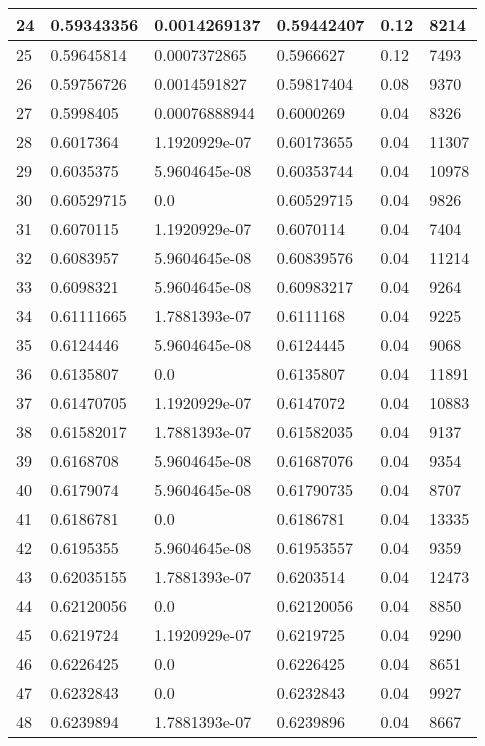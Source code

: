 \begin{longtable}{|l|l|l|l|l|l|}
24 & 0.59343356 & 0.0014269137 & 0.59442407 & 0.12 & 8214 \\ \hline 
25 & 0.59645814 & 0.0007372865 & 0.5966627 & 0.12 & 7493 \\ \hline 
26 & 0.59756726 & 0.0014591827 & 0.59817404 & 0.08 & 9370 \\ \hline 
27 & 0.5998405 & 0.00076888944 & 0.6000269 & 0.04 & 8326 \\ \hline 
28 & 0.6017364 & 1.1920929e-07 & 0.60173655 & 0.04 & 11307 \\ \hline 
29 & 0.6035375 & 5.9604645e-08 & 0.60353744 & 0.04 & 10978 \\ \hline 
30 & 0.60529715 & 0.0 & 0.60529715 & 0.04 & 9826 \\ \hline 
31 & 0.6070115 & 1.1920929e-07 & 0.6070114 & 0.04 & 7404 \\ \hline 
32 & 0.6083957 & 5.9604645e-08 & 0.60839576 & 0.04 & 11214 \\ \hline 
33 & 0.6098321 & 5.9604645e-08 & 0.60983217 & 0.04 & 9264 \\ \hline 
34 & 0.61111665 & 1.7881393e-07 & 0.6111168 & 0.04 & 9225 \\ \hline 
35 & 0.6124446 & 5.9604645e-08 & 0.6124445 & 0.04 & 9068 \\ \hline 
36 & 0.6135807 & 0.0 & 0.6135807 & 0.04 & 11891 \\ \hline 
37 & 0.61470705 & 1.1920929e-07 & 0.6147072 & 0.04 & 10883 \\ \hline 
38 & 0.61582017 & 1.7881393e-07 & 0.61582035 & 0.04 & 9137 \\ \hline 
39 & 0.6168708 & 5.9604645e-08 & 0.61687076 & 0.04 & 9354 \\ \hline 
40 & 0.6179074 & 5.9604645e-08 & 0.61790735 & 0.04 & 8707 \\ \hline 
41 & 0.6186781 & 0.0 & 0.6186781 & 0.04 & 13335 \\ \hline 
42 & 0.6195355 & 5.9604645e-08 & 0.61953557 & 0.04 & 9359 \\ \hline 
43 & 0.62035155 & 1.7881393e-07 & 0.6203514 & 0.04 & 12473 \\ \hline 
44 & 0.62120056 & 0.0 & 0.62120056 & 0.04 & 8850 \\ \hline 
45 & 0.6219724 & 1.1920929e-07 & 0.6219725 & 0.04 & 9290 \\ \hline 
46 & 0.6226425 & 0.0 & 0.6226425 & 0.04 & 8651 \\ \hline 
47 & 0.6232843 & 0.0 & 0.6232843 & 0.04 & 9927 \\ \hline 
48 & 0.6239894 & 1.7881393e-07 & 0.6239896 & 0.04 & 8667 \\ \hline 

\end{longtable}
